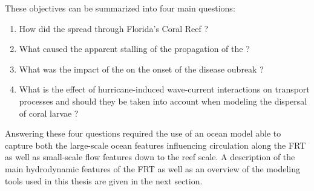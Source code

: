 These objectives can be summarized into four main questions:
\begin{enumerate}
    \item How did the  spread through Florida's Coral Reef ?
    \item What caused the apparent stalling of the propagation of the  ? 
    \item What was the impact of the  on the onset of the disease oubreak ?
    \item  What is the effect of hurricane-induced wave-current interactions on transport processes and should they be taken into account when modeling the dispersal of coral larvae ?
\end{enumerate}     
Answering these four questions required the use of an ocean model able to capture both the large-scale ocean features influencing circulation along the FRT as well as small-scale flow features down to the reef scale. A description of the main hydrodynamic features of the FRT as well as an overview of the modeling tools used in this thesis are given in the next section.

